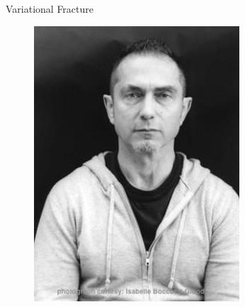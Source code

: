 \documentclass[aspectratio=169,xcolor=dvipsnames,11pt]{beamer}
\begin{document}
\begin{frame}{Variational Fracture}
\begin{minipage}{0.3\textwidth}
\begin{figure}
\begin{minipage}[b]{0.4\textwidth}
    \includegraphics[width=\linewidth]{figures/francfort.jpg}
  \end{minipage}
  \vspace{1em}
  \begin{minipage}[b]{0.4\textwidth}

\end{minipage}
\end{figure}
\end{minipage}
\end{frame}
\end{document}
